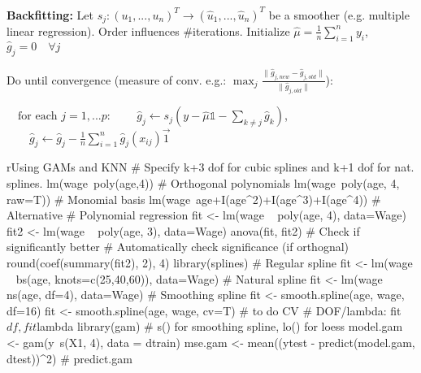 \textbf{Backfitting:}
Let $s_j: (u_1,...,u_n)^T \to (\hat u_1,...,\hat u_n)^T$ be a smoother (e.g. multiple linear regression). Order influences \#iterations.
Initialize $\hat \mu = \tfrac{ 1}{ n} \sum_{i=1}^n y_i$, \quad $\hat g_j = 0 \quad \forall j$

Do until convergence (measure of conv. e.g.: $\max_j \tfrac{\| \hat g_{j,new}-\hat g_{j,old}\|}{\| \hat g_{j,old}\|}$):

$\quad \text{for each } j=1,...p$: 
$\quad \quad \hat g_j \gets s_j(y - \hat \mu \mathbb{1} - \sum_{k \neq j} \hat g_k)$, 
$\quad \quad \hat g_j \gets \hat g_j - \tfrac 1 n \sum_{i=1}^n \hat g_j(x_{ij}) \vec{1} $


\begin{codebox}{r}{Using GAMs and KNN}
  # Specify k+3 dof for cubic splines and k+1 dof for nat. splines.
  lm(wage~poly(age,4)) # Orthogonal polynomials
  lm(wage~poly(age, 4, raw=T)) # Monomial basis
  lm(wage~age+I(age^2)+I(age^3)+I(age^4)) # Alternative
  # Polynomial regression
  fit <- lm(wage ~ poly(age, 4), data=Wage)
  fit2 <- lm(wage ~ poly(age, 3), data=Wage)
  anova(fit, fit2) # Check if significantly better
  # Automatically check significance (if orthognal)
  round(coef(summary(fit2), 2), 4)
  library(splines) # Regular spline
  fit <- lm(wage ~ bs(age, knots=c(25,40,60)), data=Wage)
  # Natural spline
  fit <- lm(wage ~ ns(age, df=4), data=Wage)
  # Smoothing spline
  fit <- smooth.spline(age, wage, df=16)
  fit <- smooth.spline(age, wage, cv=T) # to do CV
  # DOF/lambda: fit$df, fit$lambda
  library(gam)
  # s() for smoothing spline, lo() for loess
  model.gam <- gam(y~s(X1, 4), data = dtrain)
  mse.gam <- mean((ytest - predict(model.gam, dtest))^2) # predict.gam
\end{codebox}

